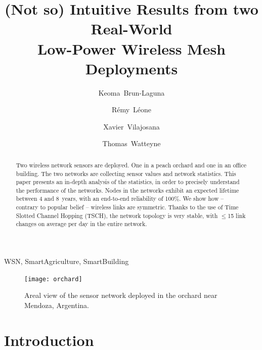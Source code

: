 \documentclass{elsarticle}
\begin{document}
\begin{frontmatter}

\date{}

\title{(Not so) Intuitive Results from two Real-World\\Low-Power Wireless Mesh Deployments}

\author[inria]{Keoma~Brun-Laguna}
\author[inria]{R\'emy~L\'eone}
\author[uoc]{Xavier~Vilajosana}
\author[inria]{Thomas~Watteyne}

\address[inria]{Inria, EVA team, Paris, France}
\address[uoc]{Univ. Oberta de Catalunya, Barcelona, Catalonia, Spain}



\begin{abstract}
Two wireless network sensors are deployed.
One in a peach orchard and one in an office building.
The two networks are collecting sensor values and network statistics.
This paper presents an in-depth analysis of the statistics, in order to precisely understand the performance of the networks.
Nodes in the networks exhibit an expected lifetime between 4 and 8~years, with an end-to-end reliability of 100\%.
We show how -- contrary to popular belief -- wireless links are symmetric.
Thanks to the use of Time Slotted Channel Hopping (TSCH), the network topology is very stable, with $\leq$15 link changes on average per day in the entire network.
\end{abstract}

\begin{keyword}
    WSN, SmartAgriculture, SmartBuilding
\end{keyword}

\end{frontmatter}


\begin{figure}
    \centering
    \texttt{[image: orchard]}
    \caption{Areal view of the sensor network deployed in the orchard near Mendoza, Argentina.}
    \label{fig:orchard}
\end{figure}

\section{Introduction}
\label{sec:intro}
\end{document}
